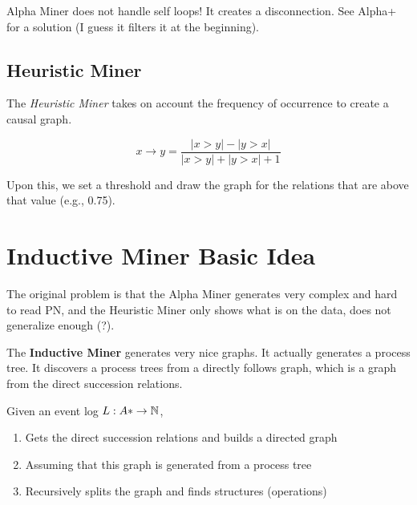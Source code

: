 Alpha Miner does not handle self loops! It creates a disconnection. See Alpha+ for a solution (I
guess it filters it at the beginning).

\subsection*{Heuristic Miner}

The \emph{Heuristic Miner} takes on account the frequency of occurrence to create a causal graph.

\[
    x\to y = \frac{|x>y| - |y>x|}{|x>y| + |y>x|+1}
\] 

Upon this, we set a threshold and draw the graph for the relations that are above that value (e.g.,
0.75).

\section*{Inductive Miner Basic Idea}

The original problem is that the Alpha Miner generates very complex and hard to read PN, and the
Heuristic Miner only shows what is on the data, does not generalize enough (?).

The \textbf{Inductive Miner} generates very nice graphs. It actually generates a process tree. It
discovers a process trees from a directly follows graph, which is a graph from the direct succession
relations.

Given an event log $L:A*\to \mathbb{N}$, 
\begin{enumerate}
    \item Gets the direct succession relations and builds a directed graph
    \item Assuming that this graph is generated from a process tree
    \item Recursively splits the graph and finds structures (operations)
\end{enumerate}
